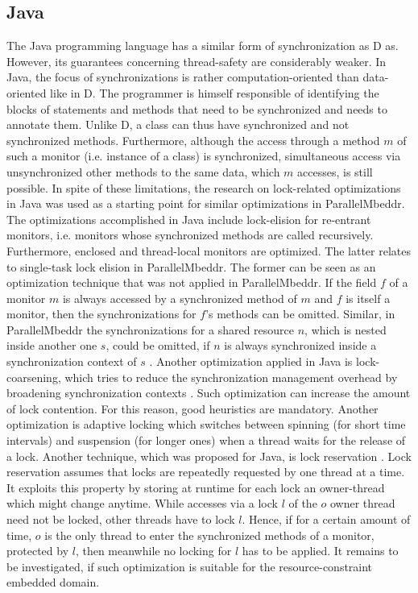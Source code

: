 \subsection{Java}
The Java programming language has a similar form of synchronization as D as. However, its guarantees concerning thread-safety are considerably weaker. In Java, the focus of synchronizations is rather computation-oriented than data-oriented like in D. The programmer is himself responsible of identifying the blocks of statements and methods that need to be synchronized and needs to annotate them. Unlike D, a class can thus have synchronized and not synchronized methods. Furthermore, although the access through a method $m$ of such a monitor (i.e. instance of a class) is synchronized, simultaneous access via unsynchronized other methods to the same data, which $m$ accesses, is still possible. In spite of these limitations, the research on lock-related optimizations in Java was used as a starting point for similar optimizations in ParallelMbeddr. The optimizations accomplished in Java include lock-elision for re-entrant monitors, i.e. monitors whose synchronized methods are called recursively. Furthermore, enclosed and thread-local monitors are optimized. The latter relates to single-task lock elision in ParallelMbeddr. The former can be seen as an optimization technique that was not applied in ParallelMbeddr. If the field $f$ of a monitor $m$ is always accessed by a synchronized method of $m$ and $f$ is itself a monitor, then the synchronizations for $f$'s methods can be omitted. Similar, in ParallelMbeddr the synchronizations for a shared resource $n$, which is nested inside another one $s$, could be omitted, if $n$ is always synchronized inside a synchronization context of $s$ \cite{StaticAnalysesForJava}. Another optimization applied in Java is lock-coarsening, which tries to reduce the synchronization management overhead by broadening synchronization contexts \cite{JavaTheoryAndPractice}. Such optimization can increase the amount of lock contention. For this reason, good heuristics are mandatory. Another optimization is adaptive locking which switches between spinning (for short time intervals) and suspension (for longer ones) when a thread waits for the release of a lock. Another technique, which was proposed for Java, is lock reservation \cite{LockReservation}. Lock reservation assumes that locks are repeatedly requested by one thread at a time. It exploits this property by storing at runtime for each lock an owner-thread which might change anytime. While accesses via a lock $l$ of the $o$ owner thread need not be locked, other threads have to lock $l$. Hence, if for a certain amount of time, $o$ is the only thread to enter the synchronized methods of a monitor, protected by $l$, then meanwhile no locking for $l$ has to be applied. It remains to be investigated, if such optimization is suitable for the resource-constraint embedded domain.

